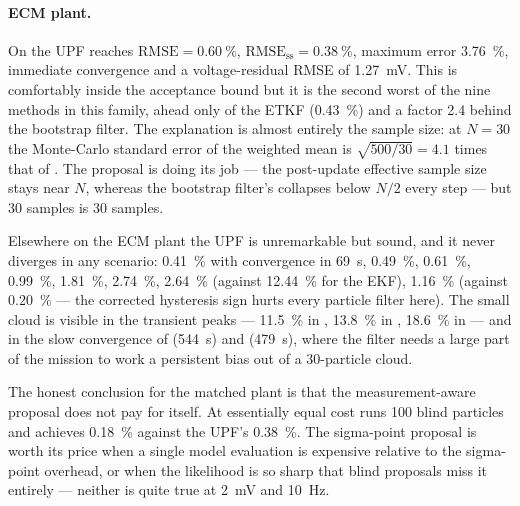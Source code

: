 \paragraph{ECM plant.}  On  the UPF reaches $\mathrm{RMSE} = \SI{0.60}{\percent}$,
$\mathrm{RMSE}_{\mathrm{ss}} = \SI{0.38}{\percent}$, maximum error \SI{3.76}{\percent}, immediate
convergence and a voltage-residual RMSE of \SI{1.27}{\milli\volt}.  This is comfortably inside the
acceptance bound but it is the second worst of the nine methods in this family, ahead only of the
ETKF (\SI{0.43}{\percent}) and a factor \num{2.4} behind the bootstrap filter.  The explanation is
almost entirely the sample size: at $N=30$ the Monte-Carlo standard error of the weighted mean is
$\sqrt{500/30} = \num{4.1}$ times that of .  The proposal is doing its job ---
the post-update effective sample size stays near $N$, whereas the bootstrap filter's collapses
below $N/2$ every step --- but 30 samples is 30 samples.

Elsewhere on the ECM plant the UPF is unremarkable but sound, and it never diverges in any
scenario:  \SI{0.41}{\percent} with convergence in \SI{69}{\second},
 \SI{0.49}{\percent},  \SI{0.61}{\percent},
 \SI{0.99}{\percent},  \SI{1.81}{\percent},
 \SI{2.74}{\percent},  \SI{2.64}{\percent} (against
\SI{12.44}{\percent} for the EKF),  \SI{1.16}{\percent} (against \SI{0.20}{\percent}
--- the corrected hysteresis sign hurts every particle filter here).  The small cloud is visible in
the transient peaks --- \SI{11.5}{\percent} in , \SI{13.8}{\percent} in
, \SI{18.6}{\percent} in  --- and in the slow convergence of
 (\SI{544}{\second}) and  (\SI{479}{\second}), where the filter
needs a large part of the mission to work a persistent bias out of a 30-particle cloud.

The honest conclusion for the matched plant is that the measurement-aware proposal does not pay for
itself.  At essentially equal cost  runs 100 blind particles and achieves
\SI{0.18}{\percent} against the UPF's \SI{0.38}{\percent}.  The sigma-point proposal is worth its
price when a single model evaluation is expensive relative to the sigma-point overhead, or when the
likelihood is so sharp that blind proposals miss it entirely --- neither is quite true at
\SI{2}{\milli\volt} and \SI{10}{\hertz}.

